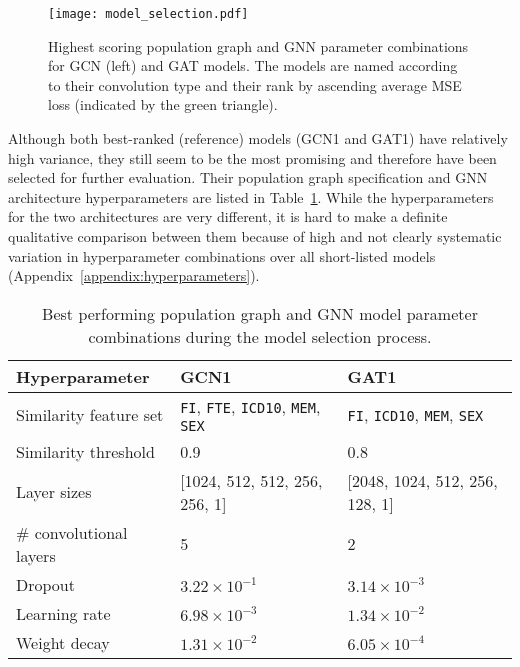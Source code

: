 \begin{figure}[h]
    \centering
    \texttt{[image: model\_selection.pdf]}
    \caption{Highest scoring population graph and GNN parameter combinations for GCN (left) and GAT models. The models are named according to their convolution type and their rank by ascending average MSE loss (indicated by the green triangle).}\label{figure:gat-gcn-rank}
\end{figure}

Although both best-ranked (reference) models (GCN1 and GAT1) have relatively high variance, they still seem to be the most promising and therefore have been selected for further evaluation. Their population graph specification and GNN architecture hyperparameters are listed in Table~\ref{table:best-hyperparameters}. While the hyperparameters for the two architectures are very different, it is hard to make a definite qualitative comparison between them because of high and not clearly systematic variation in hyperparameter combinations over all short-listed models (Appendix~\ref{appendix:hyperparameters}).

\begin{table}[]
    \caption{Best performing population graph and GNN model parameter combinations during the model selection process.}\label{table:best-hyperparameters}
    \centering
    \small
    \begin{tabular}{p{}p{}p{}}
        \hline
    \textbf{Hyperparameter} & \textbf{GCN1} & \textbf{GAT1} \\  \hline
        Similarity feature set & \texttt{FI}, \texttt{FTE}, \texttt{ICD10}, \texttt{MEM}, \texttt{SEX} & \texttt{FI}, \texttt{ICD10}, \texttt{MEM}, \texttt{SEX} \\
        Similarity threshold & 0.9 & 0.8 \\ \hline
        Layer sizes & [1024, 512, 512, 256, 256, 1] & [2048, 1024, 512, 256, 128, 1] \\
        \# convolutional layers & 5 & 2 \\
        Dropout & $3.22 \times 10^{-1}$ & $3.14 \times 10^{-3}$ \\
        Learning rate & $6.98 \times 10^{-3}$ & $1.34 \times 10^{-2}$ \\
        Weight decay & $1.31 \times 10^{-2}$ & $6.05 \times 10^{-4}$ \\ \hline
\end{tabular}
\end{table}

